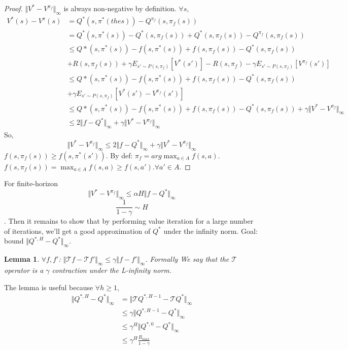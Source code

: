 \documentclass{report}
\newtheorem{lemma}[theorem]{Lemma}
\begin{document}
\begin{proof}
$\Vert V^*-V^{\pi_f}\Vert_{\infty}$ is always non-negative by definition. $\forall s$, 
\begin{equation*}
\begin{split}
V^{*}(s)-V^{\pi}(s) &= Q^*(s,\pi^*(the s))-Q^{\pi_f}(s,\pi_f(s))\\
&= Q^*(s,\pi^*(s))-Q^*(s,\pi_f(s))+Q^*(s,\pi_f(s))-Q^{\pi_f}(s,\pi_f(s))\\
&\leq Q*(s,\pi^{*}(s))-f(s,\pi^{*}(s))+f(s,\pi_f(s))-Q^*(s,\pi_f(s))\\
& +R(s,\pi_f(s))+\gamma E_{s'\sim P(s,\pi_f)}[V^*(s')]-R(s,\pi_f) - \gamma E_{s'\sim P(s,\pi_f)}[V^{\pi_f}(s')] \\
&\leq Q*(s,\pi^{*}(s))-f(s,\pi^{*}(s))+f(s,\pi_f(s))-Q^*(s,\pi_f(s))\\
&+ \gamma E_{s'\sim P(s,\pi_f)}[V^*(s')-V^{\pi_f}(s')] \\
&\leq Q*(s,\pi^{*}(s))-f(s,\pi^{*}(s))+f(s,\pi_f(s))-Q^*(s,\pi_f(s)) + \gamma \Vert V^*-V^{\pi_f} \Vert_{\infty} \\
&\leq 2\Vert f-Q^*\Vert_{\infty} + \gamma \Vert V^*-V^{\pi_f} \Vert_{\infty}
\end{split}
\end{equation*}
So, \[
\Vert V^*-V^{\pi_f} \Vert_{\infty} \leq 2\Vert f-Q^*\Vert_{\infty} + \gamma \Vert V^*-V^{\pi_f} \Vert_{\infty}
\]
$f(s,\pi_f(s)) \geq f(s,\pi^*(s'))$. By def: $\pi_f=arg\max_{a\in A}f(s,a)$. $f(s,\pi_f(s))=\max_{a\in A}f(s,a) \geq f(s,a'). \forall a' \in A$.
\end{proof}
For finite-horizon \[\Vert  V^*-V^{ \pi_f} \Vert_{\infty} \leq \alpha H \Vert f-Q^{*}\Vert_{\infty}\]
\[\frac{1}{1-\gamma} \sim H\].
Then it remains to show that by performing value iteration for a large number of iterations, we'll get a good  approximation of $Q^*$ under the infinity norm. Goal: bound $\Vert Q^{*,H}-Q^{*}\Vert_{\infty}$.
\begin{lemma}
$\forall f,f'$: $\Vert\mathcal{T}f-\mathcal{T}f'\Vert_{\infty}\leq \gamma \Vert f-f'\Vert_{\infty}$. Formally We say that the $\mathcal{T}$ operator is a $\gamma$ contraction under the L-infinity norm.
\end{lemma}
The lemma is useful because $\forall h \geq 1$, 
\begin{equation*}
\begin{split}
    \Vert Q^{*,H}-Q^{*}\Vert_{\infty}&=\Vert \mathcal{T}Q^{*,H-1}-\mathcal{T}Q^{*}\Vert_{\infty}\\
    & \leq \gamma \Vert Q^{*,H-1}-Q^{*}\Vert_{\infty} \\
    & \leq \gamma^H \Vert Q^{*,0}-Q^{*}\Vert_{\infty} \\
    & \leq \gamma^{H} \frac{R_{max}}{1-\gamma}
\end{split}
\end{equation*}
\end{document}
